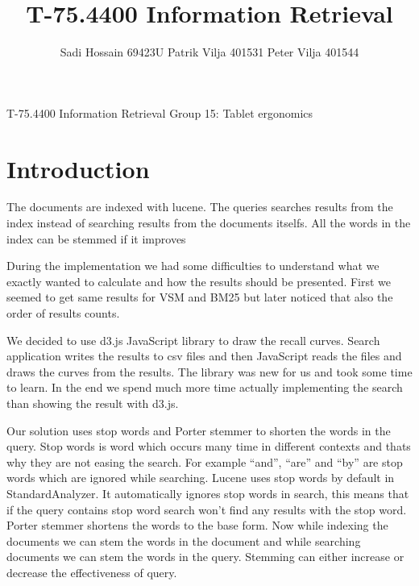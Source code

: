\documentclass{aaltoseries}
\author{Sadi Hossain 69423U \newline Patrik Vilja 401531 \newline Peter Vilja 401544}
\title{T-75.4400 Information Retrieval}
\begin{document}

\begin{preface}%
{\Huge T-75.4400 Information Retrieval}
{\huge Group 15: Tablet ergonomics}
\end{preface}

\tableofcontents

\chapter{Introduction}
The documents are indexed with lucene. The queries searches results from the index instead of searching results from the documents itselfs. All the words in the index can be stemmed if it improves 

During the implementation we had some difficulties to understand what we exactly wanted to calculate and how the results should be presented. First we seemed to get same results for VSM and BM25 but later noticed that also the order of results counts.

We decided to use d3.js JavaScript library to draw the recall curves. Search application writes the results to csv files and then JavaScript reads the files and draws the curves from the results. The library was new for us and took some time to learn. In the end we spend much more time actually implementing the search than showing the result with d3.js.

Our solution uses stop words and Porter stemmer to shorten the words in the query. Stop words is word which occurs many time in different contexts and thats why they are not easing the search. For example “and”, “are” and “by” are stop words which are ignored while searching. Lucene uses stop words by default in StandardAnalyzer. It automatically ignores stop words in search, this means that if the query contains stop word search won’t find any results with the stop word. Porter stemmer shortens the words to the base form. Now while indexing the documents we can stem the words in the document and while searching documents we can stem the words in the query. Stemming can either increase or decrease the effectiveness of query. 
\end{document}
